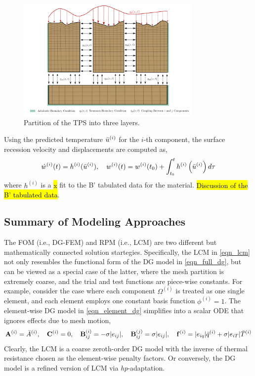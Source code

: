 \begin{figure}
    \centering
    \includegraphics[width=0.8\textwidth]{./figs/three_components.png}
    \caption{Partition of the TPS into three layers.}
    \label{fig_lcm_domain}
\end{figure}

Using the predicted temperature $\bar{u}^{(i)}$ for the $i$-th component, the surface recession velocity and displacements are computed as,
\begin{equation}
    \dot{w}^{(i)}(t) = h^{(i)}(\bar{u}^{(i)}),\quad w^{(i)}(t) = w^{(i)}(t_0) + \int_{t_0}^{t} h^{(i)}\left(\bar{u}^{(i)}\right)d\tau
\end{equation}
where $h^{(i)}$ is a \hl{x} fit to the B' tabulated data for the material. \hl{Discussion of the B' tabulated data}.

\subsection{Summary of Modeling Approaches}

The FOM (i.e., DG-FEM) and RPM (i.e., LCM) are two different but mathematically connected solution startegies. Specifically, the LCM in \cref{eqn_lcm} not only resembles the functional form of the DG model in \cref{eqn_full_dg}, but can be viewed as a special case of the latter, where the mesh partition is extremely coarse, and the trial and test functions are piece-wise constants. For example, consider the case where each component $\Omega^{(i)}$ is treated as one single element, and each element employs one constant basis function $\phi^{(i)}=1$. The element-wise DG model in \cref{eqn_element_dg} simplifies into a scalar ODE that ignores effects due to mesh motion,
\begin{equation}
    \mathbf{A}^{(i)} = \bar{A}^{(i)},\quad \mathbf{C}^{(i)} = 0, \quad\mathbf{B}^{(i)}_{ij} = -\sigma|e_{ij}|,\quad \mathbf{B}^{(j)}_{ij}=\sigma|e_{ij}|,\quad \mathbf{f}^{(i)} = |e_{iq}|\bar{q}^{(i)} + \sigma|e_{iT}|\bar{T}^{(i)}
\end{equation}
Clearly, the LCM is a coarse zeroth-order DG model with the inverse of thermal resistance chosen as the element-wise penalty factors. Or conversely, the DG model is a refined version of LCM via \textit{hp}-adaptation.

